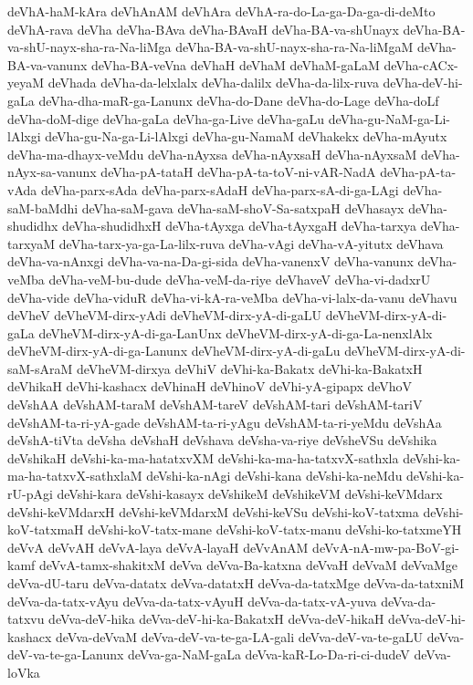 {deVhA-haM-kAra
deVhAnAM
deVhAra
deVhA-ra-do-La-ga-Da-ga-di-deMto
deVhA-rava
deVha
deVha-BAva
deVha-BAvaH
deVha-BA-va-shUnayx
deVha-BA-va-shU-nayx-sha-ra-Na-liMga
deVha-BA-va-shU-nayx-sha-ra-Na-liMgaM
deVha-BA-va-vanunx
deVha-BA-veVna
deVhaH
deVhaM
deVhaM-gaLaM
deVha-cACx-yeyaM
deVhada
deVha-da-lelxlalx
deVha-dalilx
deVha-da-lilx-ruva
deVha-deV-hi-gaLa
deVha-dha-maR-ga-Lanunx
deVha-do-Dane
deVha-do-Lage
deVha-doLf
deVha-doM-dige
deVha-gaLa
deVha-ga-Live
deVha-gaLu
deVha-gu-NaM-ga-Li-lAlxgi
deVha-gu-Na-ga-Li-lAlxgi
deVha-gu-NamaM
deVhakekx
deVha-mAyutx
deVha-ma-dhayx-veMdu
deVha-nAyxsa
deVha-nAyxsaH
deVha-nAyxsaM
deVha-nAyx-sa-vanunx
deVha-pA-tataH
deVha-pA-ta-toV-ni-vAR-NadA
deVha-pA-ta-vAda
deVha-parx-sAda
deVha-parx-sAdaH
deVha-parx-sA-di-ga-LAgi
deVha-saM-baMdhi
deVha-saM-gava
deVha-saM-shoV-Sa-satxpaH
deVhasayx
deVha-shudidhx
deVha-shudidhxH
deVha-tAyxga
deVha-tAyxgaH
deVha-tarxya
deVha-tarxyaM
deVha-tarx-ya-ga-La-lilx-ruva
deVha-vAgi
deVha-vA-yitutx
deVhava
deVha-va-nAnxgi
deVha-va-na-Da-gi-sida
deVha-vanenxV
deVha-vanunx
deVha-veMba
deVha-veM-bu-dude
deVha-veM-da-riye
deVhaveV
deVha-vi-dadxrU
deVha-vide
deVha-viduR
deVha-vi-kA-ra-veMba
deVha-vi-lalx-da-vanu
deVhavu
deVheV
deVheVM-dirx-yAdi
deVheVM-dirx-yA-di-gaLU
deVheVM-dirx-yA-di-gaLa
deVheVM-dirx-yA-di-ga-LanUnx
deVheVM-dirx-yA-di-ga-La-nenxlAlx
deVheVM-dirx-yA-di-ga-Lanunx
deVheVM-dirx-yA-di-gaLu
deVheVM-dirx-yA-di-saM-sAraM
deVheVM-dirxya
deVhiV
deVhi-ka-Bakatx
deVhi-ka-BakatxH
deVhikaH
deVhi-kashacx
deVhinaH
deVhinoV
deVhi-yA-gipapx
deVhoV
deVshAA
deVshAM-taraM
deVshAM-tareV
deVshAM-tari
deVshAM-tariV
deVshAM-ta-ri-yA-gade
deVshAM-ta-ri-yAgu
deVshAM-ta-ri-yeMdu
deVshAa
deVshA-tiVta
deVsha
deVshaH
deVshava
deVsha-va-riye
deVsheVSu
deVshika
deVshikaH
deVshi-ka-ma-hatatxvXM
deVshi-ka-ma-ha-tatxvX-sathxla
deVshi-ka-ma-ha-tatxvX-sathxlaM
deVshi-ka-nAgi
deVshi-kana
deVshi-ka-neMdu
deVshi-ka-rU-pAgi
deVshi-kara
deVshi-kasayx
deVshikeM
deVshikeVM
deVshi-keVMdarx
deVshi-keVMdarxH
deVshi-keVMdarxM
deVshi-keVSu
deVshi-koV-tatxma
deVshi-koV-tatxmaH
deVshi-koV-tatx-mane
deVshi-koV-tatx-manu
deVshi-ko-tatxmeYH
deVvA
deVvAH
deVvA-laya
deVvA-layaH
deVvAnAM
deVvA-nA-mw-pa-BoV-gi-kamf
deVvA-tamx-shakitxM
deVva
deVva-Ba-katxna
deVvaH
deVvaM
deVvaMge
deVva-dU-taru
deVva-datatx
deVva-datatxH
deVva-da-tatxMge
deVva-da-tatxniM
deVva-da-tatx-vAyu
deVva-da-tatx-vAyuH
deVva-da-tatx-vA-yuva
deVva-da-tatxvu
deVva-deV-hika
deVva-deV-hi-ka-BakatxH
deVva-deV-hikaH
deVva-deV-hi-kashacx
deVva-deVvaM
deVva-deV-va-te-ga-LA-gali
deVva-deV-va-te-gaLU
deVva-deV-va-te-ga-Lanunx
deVva-ga-NaM-gaLa
deVva-kaR-Lo-Da-ri-ci-dudeV
deVva-loVka
}
